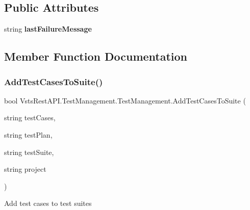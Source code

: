 \subsection*{Public Attributes}
\begin{DoxyCompactItemize}
\item 
\mbox{\label{class_vsts_rest_a_p_i_1_1_test_management_1_1_test_management_a59641e836cfa3e8872233db4f8d64da4}} 
string {\bfseries last\+Failure\+Message}
\end{DoxyCompactItemize}


\subsection{Member Function Documentation}
\mbox{\label{class_vsts_rest_a_p_i_1_1_test_management_1_1_test_management_a0c52041b2fed39904f0452d7ea26f51c}} 
\subsubsection{\texorpdfstring{Add\+Test\+Cases\+To\+Suite()}{AddTestCasesToSuite()}}
{\footnotesize\ttfamily bool Vsts\+Rest\+A\+P\+I.\+Test\+Management.\+Test\+Management.\+Add\+Test\+Cases\+To\+Suite (\begin{DoxyParamCaption}\item[{string}]{test\+Cases,  }\item[{string}]{test\+Plan,  }\item[{string}]{test\+Suite,  }\item[{string}]{project }\end{DoxyParamCaption})}



Add test cases to test suites 


